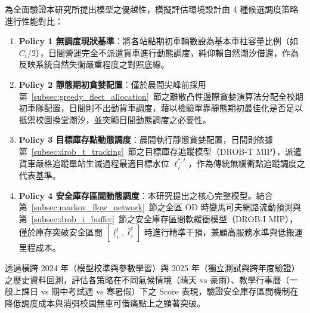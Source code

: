 為全面驗證本研究所提出模型之優越性，模擬評估環境設計由 4 種候選調度策略進行性能對比：
\begin{enumerate}
    \item \textbf{Policy 1 無調度現狀基準}：將各站點期初車輛數設為基本車柱容量比例（如 $C_i / 2$），日間營運完全不派遣貨車進行動態調度，純仰賴自然潮汐借還，作為反映系統自然失衡嚴重程度之對照底線。
    \item \textbf{Policy 2 靜態期初貪婪配置}：僅於晨間尖峰前採用第~\ref{subsec:greedy_fleet_allocation}~節之離散凸性邊際貪婪演算法分配全校期初車隊配置，日間則不出動貨車調度，藉以檢驗單靠靜態期初最佳化是否足以抵禦校園換堂潮汐，並突顯日間動態調度之必要性。
    \item \textbf{Policy 3 目標庫存點動態調度}：晨間執行靜態貪婪配置，日間則依據第~\ref{subsec:drob_t_tracking}~節之目標庫存追蹤模型（DROB-T MIP），派遣貨車嚴格追蹤單站生滅過程最適目標水位 $\ell^{*, t}_i$，作為傳統無緩衝點追蹤調度之代表基準。
    \item \textbf{Policy 4 安全庫存區間動態調度}：本研究提出之核心完整模型。結合第~\ref{subsec:markov_flow_network}~節之全區 OD 時變馬可夫網路流動預測與第~\ref{subsec:drob_i_buffer}~節之安全庫存區間軟緩衝模型（DROB-I MIP），僅於庫存突破安全區間 $[\underline{\ell}^t_i, \bar{\ell}^t_i]$ 時進行精準干預，兼顧高服務水準與低搬運里程成本。
\end{enumerate}
透過橫跨 2024 年（模型校準與參數學習）與 2025 年（獨立測試與跨年度驗證）之歷史資料回測，評估各策略在不同氣候情境（晴天 vs 豪雨）、教學行事曆（一般上課日 vs 期中考試週 vs 寒暑假）下之 $\text{Score}$ 表現，驗證安全庫存區間機制在降低調度成本與消弭校園無車可借痛點上之顯著突破。
